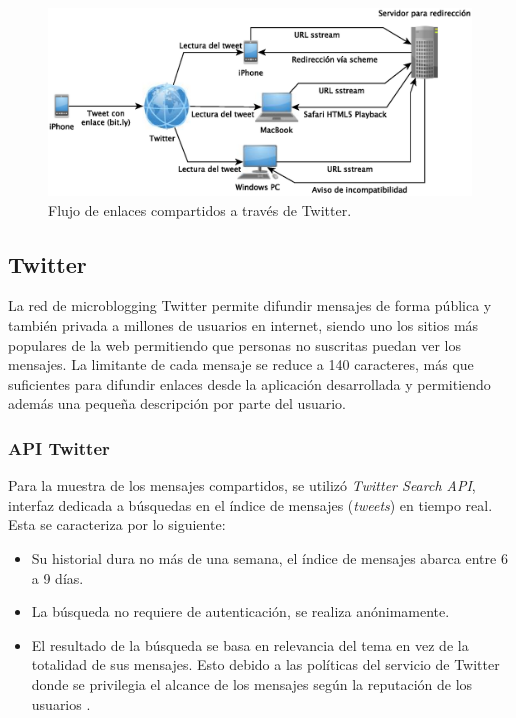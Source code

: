 	\begin{figure}[H]
		\centering
		\includegraphics[scale=0.6]{imgs/twitter-share-diagram.eps}
		\caption{Flujo de enlaces compartidos a través de Twitter.}
		\label{diagramaTwitterShare}
	\end{figure}		
	
	\subsection{Twitter}
	La red de microblogging Twitter permite difundir mensajes de forma pública y también privada a millones de usuarios en internet, siendo uno los sitios más populares de la web\cite{alexa-twitter} permitiendo que personas no suscritas puedan ver los mensajes.
	La limitante de cada mensaje se reduce a 140 caracteres, más que suficientes para difundir enlaces desde la aplicación desarrollada y permitiendo además una pequeña descripción por parte del usuario.
		\subsubsection{API Twitter}
		\label{subsec:twitter-search-api}
		Para la muestra de los mensajes compartidos, se utilizó \textit{Twitter Search API}, interfaz dedicada a búsquedas en el índice de mensajes (\textit{tweets}) en tiempo real. Esta se caracteriza por lo siguiente:
		
		\begin{itemize}
		\item Su historial dura no más de una semana, el índice de mensajes abarca entre 6 a 9 días.
		\item La búsqueda no requiere de autenticación, se realiza anónimamente.
		\item El resultado de la búsqueda se basa en relevancia del tema en vez de la totalidad de sus mensajes. Esto debido a las políticas del servicio de Twitter donde se privilegia el alcance de los mensajes según la reputación de los usuarios \cite{twitter-relevance}.
		\end{itemize}

